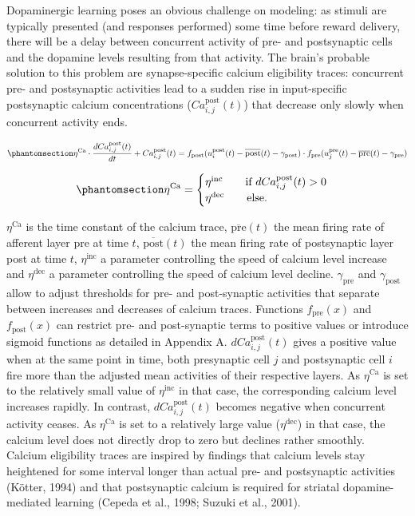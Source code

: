 \documentclass[
  11pt,
  a4paper,
]{scrbook}
\begin{document}
Dopaminergic learning poses an obvious challenge on modeling: as stimuli
are typically presented (and responses performed) some time before
reward delivery, there will be a delay between concurrent activity of
pre- and postsynaptic cells and the dopamine levels resulting from that
activity. The brain's probable solution to this problem are
synapse-specific calcium eligibility traces: concurrent pre- and
postsynaptic activities lead to a sudden rise in input-specific
postsynaptic calcium concentrations (\(Ca^\text{post}_{i,j}(t)\)) that
decrease only slowly when concurrent activity ends.

\begin{equation}\phantomsection\label{eq-nn:Ca}{
     \eta^\text{Ca} \cdot \frac{dCa^\text{post}_{i,j}(t)}{dt} + Ca^\text{post}_{i,j}(t) = f_\text{post}(u_i^\text{post}(t) - \overline{\text{post}}(t) - \gamma_\text{post}) \cdot f_\text{pre}(u_j^\text{pre}(t) - \overline{\text{pre}}(t) - \gamma_\text{pre})
}\end{equation}

\begin{equation}\phantomsection\label{eq-nn:etaCa}{
     \eta^\text{Ca} = \begin{cases} 
                    \eta^\text{inc} \qquad \text{if } dCa^\text{post}_{i,j}(t) > 0 \\
                    \eta^\text{dec} \qquad \text{else.} \\
                \end{cases}
}\end{equation}

\(\eta^\text{Ca}\) is the time constant of the calcium trace,
\(\overline{\text{pre}}(t)\) the mean firing rate of afferent layer pre
at time \(t\), \(\overline{\text{post}}(t)\) the mean firing rate of
postsynaptic layer post at time \(t\), \(\eta^\text{inc}\) a parameter
controlling the speed of calcium level increase and \(\eta^\text{dec}\)
a parameter controlling the speed of calcium level decline.
\(\gamma_\text{pre}\) and \(\gamma_\text{post}\) allow to adjust
thresholds for pre- and post-synaptic activities that separate between
increases and decreases of calcium traces. Functions \(f_\text{pre}(x)\)
and \(f_\text{post}(x)\) can restrict pre- and post-synaptic terms to
positive values or introduce sigmoid functions as detailed in Appendix
A. \(dCa^\text{post}_{i,j}(t)\) gives a positive value when at the same
point in time, both presynaptic cell \(j\) and postsynaptic cell \(i\)
fire more than the adjusted mean activities of their respective layers.
As \(\eta^\text{Ca}\) is set to the relatively small value of
\(\eta^\text{inc}\) in that case, the corresponding calcium level
increases rapidly. In contrast, \(dCa^\text{post}_{i,j}(t)\) becomes
negative when concurrent activity ceases. As \(\eta^\text{Ca}\) is set
to a relatively large value (\(\eta^\text{dec}\)) in that case, the
calcium level does not directly drop to zero but declines rather
smoothly. Calcium eligibility traces are inspired by findings that
calcium levels stay heightened for some interval longer than actual pre-
and postsynaptic activities (Kötter, 1994) and that postsynaptic calcium
is required for striatal dopamine-mediated learning (Cepeda et al.,
1998; Suzuki et al., 2001).
\end{document}
